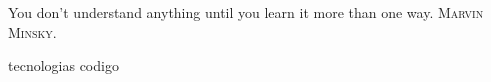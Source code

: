 %
%

{
  \epigrafe
  {%
    You don't understand anything until you learn it more than one way.%
  }
  {%
    \textsc{Marvin Minsky}.%
  }
}

{tecnologias}
{codigo}
